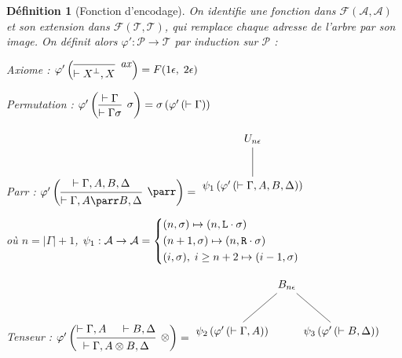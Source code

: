 \documentclass[11pt,a4paper]{article}
\newtheorem{definition}{Définition}
\newcommand*{\orth}{^\perp}
\newcommand*{\tensor}{\otimes}
\newcommand*{\hypv}[1]{\hypo{\vdash #1}}
\newcommand*{\axv}[1]{\infer{0}[\ensuremath{\mathit{ax}}]{\vdash #1}}
\newcommand*{\tensorv}[1]{\infer{2}[\ensuremath{\tensor}]{\vdash #1}}
\newcommand*{\parrv}[1]{\infer{1}[\ensuremath{\parr}]{\vdash #1}}
\newcommand*{\permv}[1]{\infer{1}[\ensuremath{\sigma}]{\vdash #1}}
\newcommand*{\Left}{\textnormal{\texttt{L}}}
\newcommand*{\Right}{\textnormal{\texttt{R}}}
\newcommand*{\proofs}{\ensuremath{\mathcal{P}}}
\newcommand*{\addresses}{\ensuremath{\mathcal{A}}}
\newcommand*{\trees}{\ensuremath{\mathcal{T}}}
\newcommand*{\encode}{\ensuremath{\varphi}}
\begin{document}
\begin{definition}[Fonction d'encodage]
    On identifie une fonction dans $\mathcal{F}(\addresses, \addresses)$ et son extension dans $\mathcal{F}(\trees, \trees)$, qui remplace chaque adresse de l'arbre par son image. On définit alors $\encode' : \proofs \rightarrow \trees$ par induction sur $\proofs$ :
    \item[Axiome :] 
    $\encode' \left(
    \begin{prooftree}
        \axv{{X}\orth, X}
    \end{prooftree}
    \right) = F(1 \epsilon, \; 2 \epsilon)$

    \item[Permutation :] 
    $\encode' \left(
    \begin{prooftree}
      \hypv{\Gamma}
      \permv{\Gamma{\sigma}}
    \end{prooftree}
    \right) = \sigma \left( \encode ' \left( \vdash \Gamma \right) \right)$

    \item[Parr :] 
    $\encode' \left(
    \begin{prooftree}
      \hypv{\Gamma, A, B, \Delta}
      \parrv{\Gamma, A \parr B, \Delta}
    \end{prooftree}
    \right) = \begin{tikzpicture}%
    [level distance=1.5cm,
    level 2/.style={sibling distance=3.5cm}]
    \node {$U_{n \epsilon}$}
        child {node {$\psi_1 \left( \encode' \left( \vdash \Gamma, A, B, \Delta \right) \right)$}
    };
    \end{tikzpicture}$
    
    où $n = | \Gamma | + 1$, $\psi_1 : \addresses \rightarrow \addresses =
    \begin{cases*}
        (n, \sigma) \mapsto (n, \Left \cdot \sigma)\\
        (n+1, \sigma) \mapsto (n, \Right \cdot \sigma)\\
        (i, \sigma), \; i \geq n+2 \mapsto (i-1, \sigma)
    \end{cases*}$

    \item[Tenseur :] 
    $\encode' \left(
    \begin{prooftree}
      \hypv{\Gamma, A}
      \hypv{B, \Delta}
      \tensorv{\Gamma, A \tensor B, \Delta}
    \end{prooftree}
    \right) = \begin{tikzpicture}%
    [level distance=1.5cm,
    level 1/.style={sibling distance=3.5cm}]
    \node {$B_{n \epsilon}$}
        child {node {$\psi_2 \left( \encode' \left( \vdash \Gamma, A \right) \right)$}}
        child {node {$\psi_3 \left( \encode' \left( \vdash B, \Delta \right) \right)$}
    };
    \end{tikzpicture}$
    

\end{definition}
\end{document}
